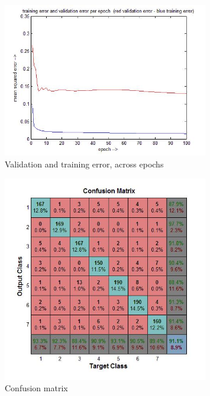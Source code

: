 \documentclass{scrartcl}
\begin{document}
\begin{figure}[p]
    \centering
    \includegraphics[width=0.8\textwidth]{validation_and_training_error.JPG}
    \caption{Validation and training error, across epochs}
    \label{fig:figure_3}
\end{figure}
\begin{figure}[p]
    \centering
    \includegraphics[width=0.8\textwidth]{Confusion_matrix.JPG}
    \caption{Confusion matrix}
    \label{fig:figure_4}
\end{figure}






 
  
\end{document}
